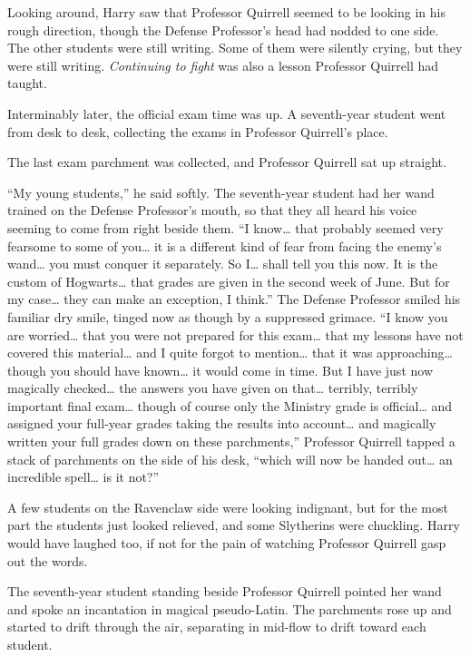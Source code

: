 Looking around, Harry saw that Professor Quirrell seemed to be looking
in his rough direction, though the Defense Professor's head had nodded
to one side. The other students were still writing. Some of them were
silently crying, but they were still writing. \emph{Continuing to fight}
was also a lesson Professor Quirrell had taught.

Interminably later, the official exam time was up. A seventh-year
student went from desk to desk, collecting the exams in Professor
Quirrell's place.

The last exam parchment was collected, and Professor Quirrell sat up
straight.

``My young students,'' he said softly. The seventh-year student had her
wand trained on the Defense Professor's mouth, so that they all heard
his voice seeming to come from right beside them. ``I know\ldots{} that
probably seemed very fearsome to some of you\ldots{} it is a different
kind of fear from facing the enemy's wand\ldots{} you must conquer it
separately. So I\ldots{} shall tell you this now. It is the custom of
Hogwarts\ldots{} that grades are given in the second week of June. But
for my case\ldots{} they can make an exception, I think.'' The Defense
Professor smiled his familiar dry smile, tinged now as though by a
suppressed grimace. ``I know you are worried\ldots{} that you were not
prepared for this exam\ldots{} that my lessons have not covered this
material\ldots{} and I quite forgot to mention\ldots{} that it was
approaching\ldots{} though you should have known\ldots{} it would come
in time. But I have just now magically checked\ldots{} the answers you
have given on that\ldots{} terribly, terribly important final
exam\ldots{} though of course only the Ministry grade is
official\ldots{} and assigned your full-year grades taking the results
into account\ldots{} and magically written your full grades down on
these parchments,'' Professor Quirrell tapped a stack of parchments on
the side of his desk, ``which will now be handed out\ldots{} an
incredible spell\ldots{} is it not?''

A few students on the Ravenclaw side were looking indignant, but for the
most part the students just looked relieved, and some Slytherins were
chuckling. Harry would have laughed too, if not for the pain of watching
Professor Quirrell gasp out the words.

The seventh-year student standing beside Professor Quirrell pointed her
wand and spoke an incantation in magical pseudo-Latin. The parchments
rose up and started to drift through the air, separating in mid-flow to
drift toward each student.

